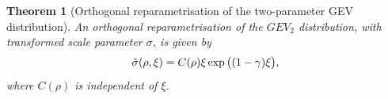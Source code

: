 \documentclass{article}
\newcommand{\s}{\geq}
\newcommand{\1}{\mathds{1}}
\newtheorem{theorem}{Theorem}[section]
\theoremstyle{definition}
\begin{document}
\begin{theorem}[Orthogonal reparametrisation of the two-parameter GEV distribution]\label{thm:2-GEV} An orthogonal reparametrisation of the $GEV_2$ distribution, with transformed scale parameter $\sigma$, is given by
\begin{equation*}
    \Tilde{\sigma}(\rho,\xi) = C(\rho)\xi\exp\big((1-\gamma)\xi\big),
\end{equation*}
    where $C(\rho)$ is independent of $\xi$.

\end{theorem}


\end{document}
